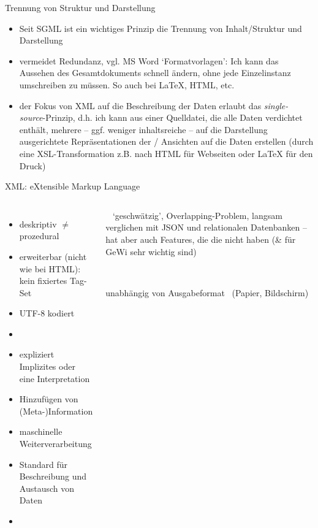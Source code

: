 \begin{frame}{Trennung von Struktur und Darstellung}

\begin{itemize}
    \item Seit SGML ist ein wichtiges Prinzip die Trennung von Inhalt/Struktur und Darstellung
    \item vermeidet Redundanz, vgl. MS Word `Formatvorlagen': Ich kann das Aussehen des Gesamtdokuments schnell ändern, ohne jede Einzelinstanz umschreiben zu müssen. So auch bei \LaTeX{}, HTML, etc.
    \item der Fokus von XML auf die Beschreibung der Daten erlaubt das \emph{single-source}-Prinzip, d.h. ich kann aus einer Quelldatei, die alle Daten verdichtet enthält, mehrere -- ggf. weniger inhaltsreiche -- auf die Darstellung ausgerichtete Repräsentationen der / Ansichten auf die Daten erstellen (durch eine XSL-Transformation z.B. nach HTML für Webseiten oder \LaTeX{} für den Druck)
\end{itemize}

\end{frame}


\begin{frame}{XML: eXtensible Markup Language}
\begin{columns}
\footnotesize
\begin{itemize}
    \item deskriptiv $\neq$ prozedural \item erweiterbar (nicht wie bei HTML): kein fixiertes Tag-Set \item UTF-8 kodiert
    \item {}
     \item expliziert Implizites oder eine Interpretation \item Hinzufügen von (Meta-)Information \item maschinelle Weiterverarbeitung 
     \item Standard für Beschreibung und Austausch von Daten 
     \item {}
\end{itemize}
\footnotesize
\begin{block}{}
~  `geschwätzig', Overlapping-Problem, langsam verglichen mit JSON und relationalen Datenbanken -- hat aber auch Features, die die nicht haben (\& für GeWi sehr wichtig sind)
\medskip

~ 
\medskip

{unabhängig von Ausgabeformat}~ (Papier, Bildschirm)
\end{block}
\end{columns}


\end{frame}



